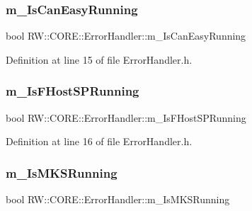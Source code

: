 \subsubsection{\texorpdfstring{m\+\_\+\+Is\+Can\+Easy\+Running}{m\_IsCanEasyRunning}}
{\footnotesize\ttfamily bool R\+W\+::\+C\+O\+R\+E\+::\+Error\+Handler\+::m\+\_\+\+Is\+Can\+Easy\+Running\hspace{0.3cm}{\ttfamily [private]}}



Definition at line 15 of file Error\+Handler.\+h.

\hypertarget{class_r_w_1_1_c_o_r_e_1_1_error_handler_afbf39dd927a052468bbf9792981e73c1}{}\label{class_r_w_1_1_c_o_r_e_1_1_error_handler_afbf39dd927a052468bbf9792981e73c1} 
\subsubsection{\texorpdfstring{m\+\_\+\+Is\+F\+Host\+S\+P\+Running}{m\_IsFHostSPRunning}}
{\footnotesize\ttfamily bool R\+W\+::\+C\+O\+R\+E\+::\+Error\+Handler\+::m\+\_\+\+Is\+F\+Host\+S\+P\+Running\hspace{0.3cm}{\ttfamily [private]}}



Definition at line 16 of file Error\+Handler.\+h.

\hypertarget{class_r_w_1_1_c_o_r_e_1_1_error_handler_acd15489cf612e45395d48c6054579380}{}\label{class_r_w_1_1_c_o_r_e_1_1_error_handler_acd15489cf612e45395d48c6054579380} 
\subsubsection{\texorpdfstring{m\+\_\+\+Is\+M\+K\+S\+Running}{m\_IsMKSRunning}}
{\footnotesize\ttfamily bool R\+W\+::\+C\+O\+R\+E\+::\+Error\+Handler\+::m\+\_\+\+Is\+M\+K\+S\+Running\hspace{0.3cm}{\ttfamily [private]}}



